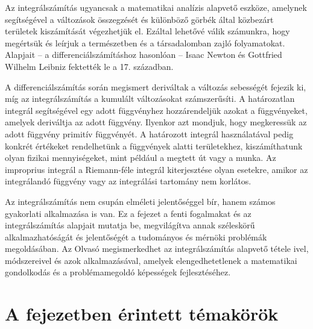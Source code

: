 \bgroup
\color{gray!50!black}
\sffamily

Az integrálszámítás ugyancsak a matematikai analízis alapvető eszköze, amelynek
segítségével a változások összegzését és különböző görbék által közbezárt
területek kiszámítását végezhetjük el. Ezáltal lehetővé válik számunkra, hogy
megértsük és leírjuk a természetben és a társadalomban zajló folyamatokat.
Alapjait -- a differenciálszámításhoz hasonlóan -- Isaac Newton és Gottfried
Wilhelm Leibniz fektették le a 17. században.

A differenciálszámítás során megismert deriváltak a változás sebességét fejezik
ki, míg az integrálszámítás a kumulált változásokat számszerűsíti. A
határozatlan integrál segítségével egy adott függvényhez hozzárendeljük azokat a
függvényeket, amelyek deriváltja az adott függvény. Ilyenkor azt mondjuk, hogy
megkeressük az adott függvény primitív függvényét. A határozott integrál
használatával pedig konkrét értékeket rendelhetünk a függvények alatti
területekhez, kiszámíthatunk olyan fizikai mennyiségeket, mint például a megtett
út vagy a munka. Az improprius integrál a Riemann-féle integrál kiterjesztése
olyan esetekre, amikor az integrálandó függvény vagy az integrálási tartomány
nem korlátos.

Az integrálszámítás nem csupán elméleti jelentőséggel bír, hanem számos
gyakorlati alkalmazása is van. Ez a fejezet a fenti fogalmakat és az
integrálszámítás alapjait mutatja be, megvilágítva annak széleskörű
alkalmazhatóságát és jelentőségét a tudományos és mérnöki problémák
megoldásában. Az Olvasó megismerkedhet az integrálszámítás alapvető tétele
ivel, módszereivel és azok alkalmazásával, amelyek elengedhetetlenek a
matematikai gondolkodás és a problémamegoldó képességek fejlesztéséhez.


\section*{A fejezetben érintett témakörök}

\hspace{0.0cm}\parbox{14.8cm}{}\par
\hspace{0.4cm}\parbox{14.1cm}{}\par
\hspace{0.8cm}\parbox{13.4cm}{}\par
\hspace{1.2cm}\parbox{12.6cm}{}\par
\hspace{1.6cm}\parbox{11.8cm}{}\par

\egroup
\clearpage